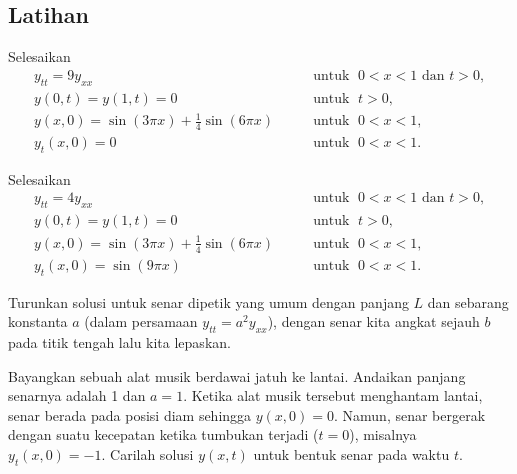\subsection{Latihan}

\begin{exercise}
Selesaikan
\begin{equation*}
\begin{array}{ll}
y_{tt} = 9 y_{xx}  & \qquad \text{untuk } \; 0 < x < 1 \text{ dan } t > 0,  \\
y(0,t) = y(1,t) = 0 & \qquad \text{untuk } \; t > 0 ,  \\
y(x,0) = \sin (3\pi x) + \frac{1}{4} \sin (6 \pi x) & \qquad \text{untuk } \; 0 < x < 1 , \\
y_t(x,0) = 0 & \qquad \text{untuk } \; 0 < x < 1 .
\end{array}
\end{equation*}
\end{exercise}

\begin{exercise}
Selesaikan
\begin{equation*}
\begin{array}{ll}
y_{tt} = 4 y_{xx} & \qquad \text{untuk } \; 0 < x < 1 \text{ dan } t > 0, \\
y(0,t) = y(1,t) = 0 & \qquad \text{untuk } \; t > 0,  \\
y(x,0) = \sin (3\pi x) + \frac{1}{4} \sin (6 \pi x) & \qquad \text{untuk } \; 0 < x < 1 , \\
y_t(x,0) = \sin (9 \pi x) & \qquad \text{untuk } \; 0 < x < 1 .
\end{array}
\end{equation*}
\end{exercise}

\begin{exercise}
Turunkan solusi untuk senar dipetik yang umum dengan panjang $L$ dan
sebarang konstanta $a$ (dalam persamaan $y_{tt} = a^2 y_{xx}$), dengan senar
kita angkat sejauh $b$ pada titik tengah lalu kita lepaskan.
\end{exercise}

\begin{samepage}
\begin{exercise}
Bayangkan sebuah alat musik berdawai jatuh ke lantai.  Andaikan
panjang senarnya adalah 1 dan $a=1$.  Ketika alat musik tersebut menghantam
lantai, senar berada pada posisi diam sehingga $y(x,0) = 0$.  Namun,
senar bergerak dengan suatu kecepatan ketika tumbukan terjadi ($t=0$),
misalnya $y_t(x,0) = -1$.  Carilah
solusi
$y(x,t)$ untuk bentuk senar pada waktu $t$.
\end{exercise}
\end{samepage}

